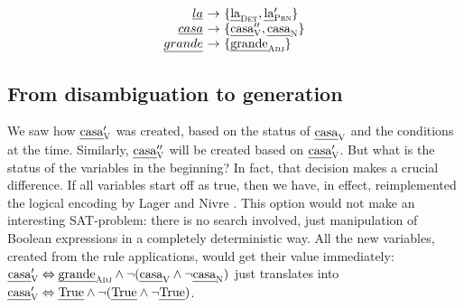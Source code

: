 $$\begin{array}{r @{~\rightarrow~} l}
\emph{la} & \{\laDet, \la{}'_\prn \} \\
\emph{casa} & \{\casa{}''_\v, \casaN \} \\
\emph{grande} & \{ \grandeAdj \} \\
\end{array}$$






\subsection{From disambiguation to generation}


We saw how $\text{\em casa}{}'_{\text{\sc V}}$ was created, based on the status of $\text{\em casa}_{\text{\sc V}}$
and the conditions at the time. Similarly, $\text{\em casa}{}''_{\text{\sc V}}$ will be
created based on $\text{\em casa}{}'_{\text{\sc V}}$.
But what is the status of the variables in the beginning?
In fact, that decision makes a crucial difference.  If all variables
start off as true, then we have, in effect, reimplemented the logical
encoding by Lager and Nivre \cite{lager_nivre01}.  This option would
not make an interesting SAT-problem: there is no search involved, just
manipulation of Boolean expressions in a completely deterministic way.
All the new variables, created from the rule applications, would get
their value immediately:
$\text{\em casa}{}'_{\text{\sc V}} \Leftrightarrow \text{\em grande}_{\text{\sc Adj}} \wedge \neg
(\text{\em casa}_{\text{\sc V}} \wedge \neg \text{\em casa}_{\text{\sc N}})$ just translates into
$\text{\em casa}{}'_{\text{\sc V}} \Leftrightarrow \text{\em True} \wedge \neg (\text{\em
True} \wedge \neg \text{\em True})$.


